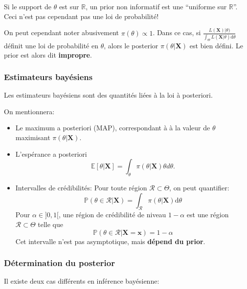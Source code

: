 \documentclass[]{article}
\providecommand{\tightlist}{%
  \setlength{\itemsep}{0pt}\setlength{\parskip}{0pt}}
\begin{document}
Si le support de \(\theta\) est sur \(\mathbb{R}\), un prior non
informatif est une ``uniforme sur \(\mathbb{R}\)''. Ceci n'est pas
cependant pas une loi de probabilité!

On peut cependant noter abusivement \(\pi(\theta) \propto 1\). Dans ce
cas, si
\(\frac{L(\mathbf{X}) \vert \theta)}{\int_\Theta L\left(\mathbf{X} \vert \theta\right)\text{d} \theta}\)
définit une loi de probabilité en \(\theta\), alors le posterior
\(\pi(\theta\vert \mathbf{X})\) est bien défini. Le prior est alors dit
\textbf{impropre}.

\hypertarget{estimateurs-bayuxe9siens}{%
\subsubsection{Estimateurs bayésiens}\label{estimateurs-bayuxe9siens}}

Les estimateurs bayésiens sont des quantités liées à la loi à
posteriori.

On mentionnera:

\begin{itemize}
\tightlist
\item
  Le maximum a posteriori (MAP), correspondant à à la valeur de
  \(\theta\) maximisant \(\pi(\theta\vert \mathbf{X})\).
\item
  L'espérance a posteriori
  \[\mathbb{E}[\theta \vert \mathbf{X}] = \int_\theta \pi(\theta \vert \mathbf{X}) \theta d \theta.\]
\item
  Intervalles de crédibilités: Pour toute région
  \(\mathcal{R} \subset \Theta\), on peut quantifier:
  \[\mathbb{P}(\theta \in \mathcal{R} \vert  \mathbf{X}) = \int_\mathcal{R} \pi(\theta \vert \mathbf{X}) \text{d}\theta\]
  Pour \(\alpha \in ]0, 1[\), une région de crédibilité de niveau
  \(1-\alpha\) est une région \(\mathcal{R} \subset \Theta\) telle que
  \[\mathbb{P}(\theta \in \mathcal{R} \vert  \mathbf{X} = \mathbf{x}) = 1 - \alpha\]
  Cet intervalle n'est pas asymptotique, mais \textbf{dépend du prior}.
\end{itemize}

\hypertarget{duxe9termination-du-posterior}{%
\subsubsection{Détermination du
posterior}\label{duxe9termination-du-posterior}}

Il existe deux cas différents en inférence bayésienne:
\end{document}
